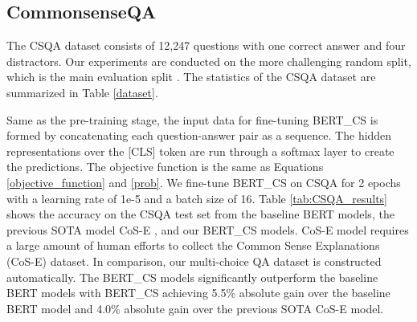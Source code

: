 \documentclass[11pt,a4paper]{article}
\begin{document}
\subsection{CommonsenseQA}
\label{subsect:csqa}
The CSQA dataset consists of 12,247 questions with one correct answer and four distractors.
Our experiments are conducted on the more challenging random split, which is the main evaluation split \citet{talmor-etal-2019-commonsenseqa}.
The statistics of the CSQA dataset are summarized in Table \ref{dataset}.

Same as the pre-training stage, the input data for fine-tuning BERT\_CS is formed by concatenating each question-answer pair as a sequence. The hidden representations over the [CLS] token are run through a softmax layer to create the predictions.
The objective function is the same as Equations \ref{objective_function} and \ref{prob}.
We fine-tune BERT\_CS on CSQA for 2 epochs with a learning rate of 1e-5 and a batch size of 16. Table \ref{tab:CSQA_results} shows the accuracy on the CSQA test set from the baseline BERT models, the previous SOTA model CoS-E \citep{rajani2019explain}, and our BERT\_CS models. 
CoS-E model requires a large amount of human efforts to collect the Common Sense Explanations (CoS-E) dataset. 
In comparison, our multi-choice QA dataset  is constructed automatically. The BERT\_CS models significantly outperform the baseline BERT models with BERT\_CS achieving 5.5\% absolute gain over the baseline BERT model and 4.0\% absolute gain over the previous SOTA CoS-E model.
\end{document}
